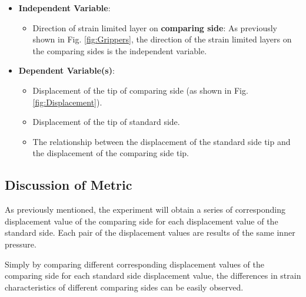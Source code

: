 \documentclass[conference]{IEEEtran}
\begin{document}
\begin{itemize}
    \item \textbf{Independent Variable}: 
        \begin{itemize}
            \item Direction of strain limited layer on \textbf{comparing side}: As previously shown in Fig. \ref{fig:Grippers}, the direction of the strain limited layers on the comparing sides is the independent variable. 
        \end{itemize}
    \item \textbf{Dependent Variable(s)}: 
         \begin{itemize}
             \item Displacement of the tip of comparing side (as shown in Fig. \ref{fig:Displacement}).
             \item Displacement of the tip of standard side.
             \item The relationship between the displacement of the standard side tip and the displacement of the comparing side tip.
         \end{itemize}
\end{itemize}

\subsection{Discussion of Metric}

As previously mentioned, the experiment will obtain a series of corresponding displacement value of the comparing side for each displacement value of the standard side. Each pair of the displacement values are results of the same inner pressure.

 Simply by comparing different corresponding displacement values of the comparing side for each standard side displacement value, the differences in strain characteristics of different comparing sides can be easily observed.
\end{document}
